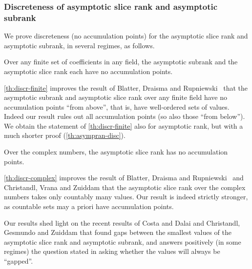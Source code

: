 \documentclass{daj}
\begin{document}
%

%



\subsubsection{Discreteness of 
asymptotic slice rank and asymptotic subrank}
%
We prove discreteness (no accumulation points) for the asymptotic slice rank and asymptotic subrank, in several regimes, as follows.


\begin{theorem}\label{th:discr-finite}
    Over any finite set of coefficients in any field, the asymptotic subrank and the asymptotic slice rank each have no accumulation points.
\end{theorem}

%

\autoref{th:discr-finite} improves the result of Blatter, Draisma and Rupniewski~\cite{bdr} that the asymptotic subrank and asymptotic slice rank over any finite field have no accumulation points ``from above'', that is, have well-ordered sets of values. Indeed our result rules out all accumulation points (so also those ``from below''). We obtain the statement of \autoref{th:discr-finite}  also for asymptotic rank, but with a much shorter proof (\autoref{th:asympran-disc}).

\begin{theorem}\label{th:discr-complex}
    Over the complex numbers, the asymptotic slice rank has no accumulation points.
\end{theorem}

\autoref{th:discr-complex} improves the result of Blatter, Draisma and Rupniewski~\cite{https://doi.org/10.48550/arxiv.2212.12219} and Christandl, Vrana and Zuiddam \cite{MR4495838} that the asymptotic slice rank over the complex numbers takes only countably many values. Our result is indeed strictly stronger, as countable sets may a priori have accumulation points. %

Our results shed light on the recent results of Costa and Dalai \cite{DBLP:journals/jcta/CostaD21} and Christandl, Gesmundo and Zuiddam \cite{cgz} that found gaps between the smallest values of the asymptotic slice rank and asymptotic subrank, and answers positively (in some regimes) the question stated in \cite{cgz} asking whether the values will always be ``gapped''.
\end{document}
